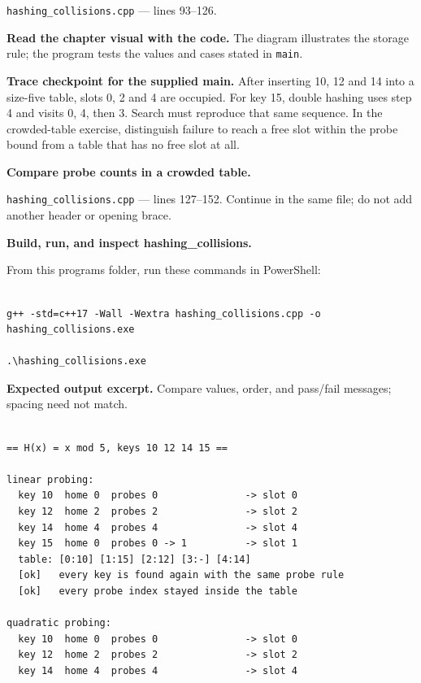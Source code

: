 \texttt{hashing\_collisions.cpp} --- lines 93--126.

\textbf{Read the chapter visual with the code.} The diagram illustrates the storage rule; the program tests the values and cases stated in \texttt{main}.


\textbf{Trace checkpoint for the supplied main.} After inserting 10, 12 and 14 into a size-five table, slots 0, 2 and 4 are occupied. For key 15, double hashing uses step 4 and visits 0, 4, then 3. Search must reproduce that same sequence. In the crowded-table exercise, distinguish failure to reach a free slot within the probe bound from a table that has no free slot at all.




\tcbbreak

\begin{utpsteps}\setcounter{enumi}{4}\item \textbf{Compare probe counts in a crowded table.}\end{utpsteps}

\texttt{hashing\_collisions.cpp} --- lines 127--152. Continue in the same file; do not add another header or opening brace.






\tcbbreak

\textbf{Build, run, and inspect hashing\_collisions.}

From this program\textquotesingle s folder, run these commands in PowerShell:

\begin{lstlisting}[style=utpterminal,language={}]

g++ -std=c++17 -Wall -Wextra hashing_collisions.cpp -o hashing_collisions.exe

.\hashing_collisions.exe

\end{lstlisting}

\textbf{Expected output excerpt.} Compare values, order, and pass/fail messages; spacing need not match.

\begin{lstlisting}[style=utpterminal,language={}]

== H(x) = x mod 5, keys 10 12 14 15 ==

linear probing:
  key 10  home 0  probes 0               -> slot 0
  key 12  home 2  probes 2               -> slot 2
  key 14  home 4  probes 4               -> slot 4
  key 15  home 0  probes 0 -> 1          -> slot 1
  table: [0:10] [1:15] [2:12] [3:-] [4:14] 
  [ok]   every key is found again with the same probe rule
  [ok]   every probe index stayed inside the table

quadratic probing:
  key 10  home 0  probes 0               -> slot 0
  key 12  home 2  probes 2               -> slot 2
  key 14  home 4  probes 4               -> slot 4

\end{lstlisting}

